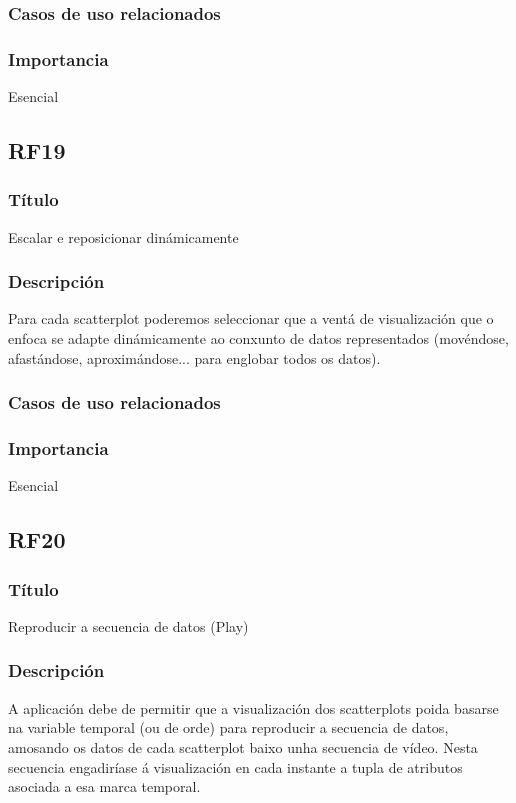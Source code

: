 \subsubsection{Casos de uso relacionados}
\subsubsection{Importancia}
Esencial

\subsection{RF19}
\subsubsection{Título}
Escalar e reposicionar dinámicamente
\subsubsection{Descripción}
Para cada scatterplot poderemos seleccionar que a ventá de visualización que o enfoca se adapte dinámicamente ao conxunto de datos representados (movéndose, afastándose, aproximándose... para englobar todos os datos).
\subsubsection{Casos de uso relacionados}
\subsubsection{Importancia}
Esencial

\subsection{RF20}
\subsubsection{Título}
Reproducir a secuencia de datos (Play)
\subsubsection{Descripción}
A aplicación debe de permitir que a visualización dos scatterplots poida basarse na variable temporal (ou de orde) para reproducir a secuencia de datos, amosando os datos de cada scatterplot baixo unha secuencia de vídeo. Nesta secuencia engadiríase á visualización en cada instante a tupla de atributos asociada a esa marca temporal. 
